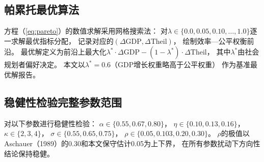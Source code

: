 \documentclass[UTF8,a4paper,12pt]{ctexart}
\theoremstyle{plain}
\theoremstyle{definition}
\theoremstyle{remark}
\begin{document}
\subsection{帕累托最优算法}

方程（\ref{eq:pareto}）的数值求解采用网格搜索法：
对$\lambda\in\{0.0,0.05,0.10,\ldots,1.0\}$逐一求解最优指标分配，
记录对应的$(\Delta\text{GDP},\Delta\text{Theil})$，
绘制效率—公平权衡前沿。
最优解定义为前沿上最大化$\lambda^*\cdot\Delta\text{GDP}-(1-\lambda^*)\cdot\Delta\text{Theil}$，
其中$\lambda^*$由社会规划者偏好决定。
本文以$\lambda^*=0.6$（GDP增长权重略高于公平权重）
作为基准最优解报告。

\subsection{稳健性检验完整参数范围}

对以下参数进行稳健性检验：
$\alpha\in\{0.55,0.67,0.80\}$，
$\eta\in\{0.10,0.13,0.16\}$，
$\kappa\in\{2,3,4\}$，
$\sigma\in\{0.55,0.65,0.75\}$，
$\rho\in\{0.05,0.103,0.20,0.30\}$。
$\rho$的极值以Aschauer（1989）的0.30和本文保守估计0.05为上下界，
在所有参数扰动下方向性结论保持稳健。
\end{document}
